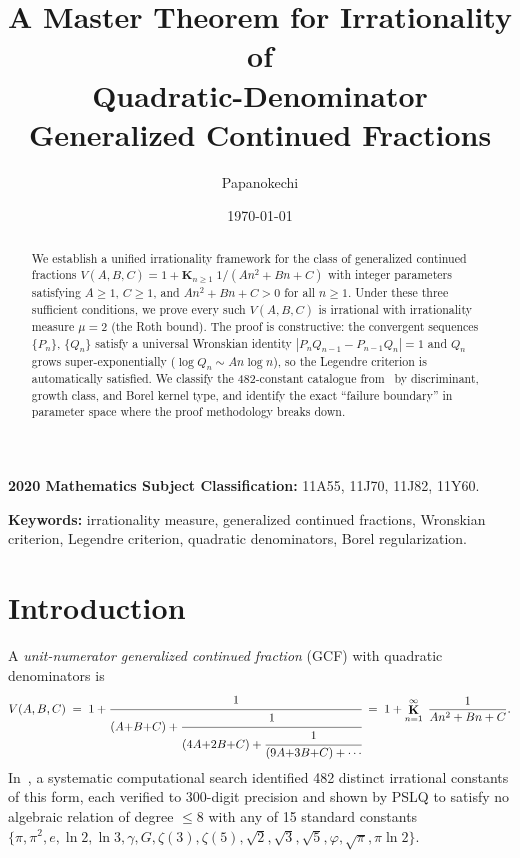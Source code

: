\documentclass[11pt,a4paper]{article}
\title{A Master Theorem for Irrationality of\\
Quadratic-Denominator Generalized Continued Fractions}
\author{Papanokechi}
\date{\today}
\theoremstyle{definition}
\theoremstyle{remark}
\begin{document}
\maketitle

\begin{abstract}
We establish a unified irrationality framework for the class of
generalized continued fractions $V(A,B,C) = 1 + \mathbf{K}_{n \ge 1}\;
1/(An^2+Bn+C)$ with integer parameters satisfying $A \ge 1$, $C \ge 1$,
and $An^2+Bn+C > 0$ for all $n \ge 1$.
Under these three sufficient conditions, we prove every such $V(A,B,C)$
is irrational with irrationality measure $\mu = 2$
(the Roth bound).
The proof is constructive: the convergent sequences $\{P_n\}$, $\{Q_n\}$
satisfy a universal Wronskian identity $|P_n Q_{n-1} - P_{n-1} Q_n| = 1$
and $Q_n$ grows super-exponentially ($\log Q_n \sim An\log n$),
so the Legendre criterion is automatically satisfied.
We classify the 482-constant catalogue from~\cite{pcf_vquad} by
discriminant, growth class, and Borel kernel type, and identify the
exact ``failure boundary'' in parameter space where the proof methodology breaks down.
\end{abstract}

\noindent
\textbf{2020 Mathematics Subject Classification:} 11A55, 11J70, 11J82, 11Y60.

\noindent
\textbf{Keywords:} irrationality measure, generalized continued fractions,
Wronskian criterion, Legendre criterion, quadratic denominators, Borel regularization.

\section{Introduction}\label{sec:intro}

A \emph{unit-numerator generalized continued fraction} (GCF) with
quadratic denominators is
\begin{equation}\label{eq:VABC}
  V(A,B,C) \;=\; 1 + \cfrac{1}{(A{+}B{+}C) +
    \cfrac{1}{(4A{+}2B{+}C) +
      \cfrac{1}{(9A{+}3B{+}C) + \cdots}}}
  \;=\; 1 + \mathop{\mathbf{K}}_{n=1}^{\infty}\;\frac{1}{An^2+Bn+C}.
\end{equation}
In~\cite{pcf_vquad}, a systematic computational search identified 482
distinct irrational constants of this form, each verified to 300-digit
precision and shown by PSLQ to satisfy no algebraic relation of degree
$\le 8$ with any of 15 standard constants
$\{\pi, \pi^2, e, \ln 2, \ln 3, \gamma, G, \zeta(3), \zeta(5),
\sqrt{2}, \sqrt{3}, \sqrt{5}, \varphi, \sqrt{\pi}, \pi\ln 2\}$.
\end{document}
